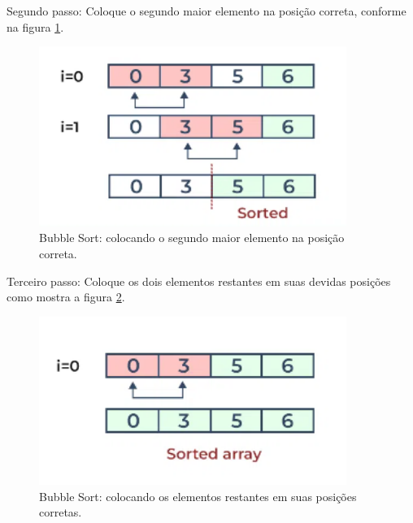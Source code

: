Segundo passo: Coloque o segundo maior elemento na posição correta, conforme na figura \ref{fig:b2}.

\begin{figure}[h!]
    \centering
    \includegraphics[width = 10cm]{Imagens/Bubble Sort/bubble2.png}
    \caption{Bubble Sort: colocando o segundo maior elemento na posição correta.}
    \label{fig:b2}
\end{figure}

Terceiro passo: Coloque os dois elementos restantes em suas devidas posições como mostra a figura \ref{fig:b3}.

\begin{figure}[h!]
    \centering
    \includegraphics[width = 10cm]{Imagens/Bubble Sort/bubble3.png}
    \caption{Bubble Sort: colocando os elementos restantes em suas posições corretas.}
    \label{fig:b3}
\end{figure}